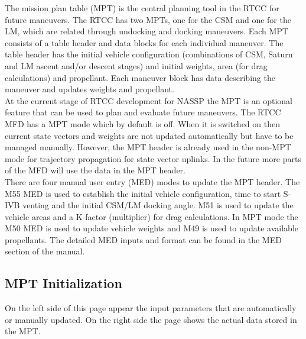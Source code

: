 \documentclass[11pt]{article} %
\begin{document}
The mission plan table (MPT) is the central planning tool in the RTCC for future maneuvers. The RTCC has two MPTs, one for the CSM and one for the LM, which are related through undocking and docking maneuvers. Each MPT consists of a table header and data blocks for each individual maneuver. The table header has the initial vehicle configuration (combinations of CSM, Saturn and LM ascent and/or descent stages) and initial weights, area (for drag calculations) and propellant. Each maneuver block has data describing the maneuver and updates weights and propellant.\\

At the current stage of RTCC development for NASSP the MPT is an optional feature that can be used to plan and evaluate future maneuvers. The RTCC MFD has a MPT mode which by default is off. When it is switched on then current state vectors and weights are not updated automatically but have to be managed manually. However, the MPT header is already used in the non-MPT mode for trajectory propagation for state vector uplinks. In the future more parts of the MFD will use the data in the MPT header.\\

There are four manual user entry (MED) modes to update the MPT header. The M55 MED is used to establish the initial vehicle configuration, time to start S-IVB venting and the initial CSM/LM docking angle. M51 is used to update the vehicle areas and a K-factor (multiplier) for drag calculations. In MPT mode the M50 MED is used to update vehicle weights and M49 is used to update available propellants. The detailed MED inputs and format can be found in the MED section of the manual.\\
\subsection{MPT Initialization}

On the left side of this page appear the input parameters that are automatically or manually updated. On the right side the page shows the actual data stored in the MPT.\\
\end{document}
